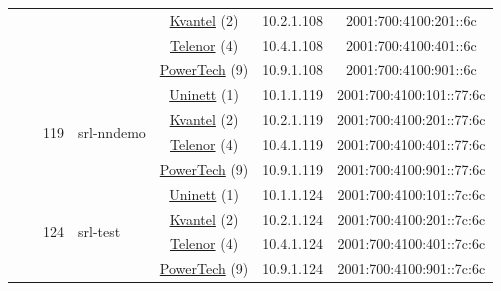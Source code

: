 \begin{small}
\begin{center}
\begin{longtable}{|c|c|c|c|c|c|c|c|}
  &  & \multicolumn{2}{|c|}{} & \multicolumn{2}{|c|}{\tiny{\href{http://kvantel.no}{Kvantel} (2)}} & \tiny{10.2.1.108} & \tiny{2001:700:4100:201::6c} \\* \cline{5-5}\cline{6-6}\cline{7-7}\cline{8-8}
  &  & \multicolumn{2}{|c|}{} & \multicolumn{2}{|c|}{\tiny{\href{https://www.telenor.no}{Telenor} (4)}} & \tiny{10.4.1.108} & \tiny{2001:700:4100:401::6c} \\* \cline{5-5}\cline{6-6}\cline{7-7}\cline{8-8}
  &  & \multicolumn{2}{|c|}{} & \multicolumn{2}{|c|}{\tiny{\href{http://www.powertech.no}{PowerTech} (9)}} & \tiny{10.9.1.108} & \tiny{2001:700:4100:901::6c} \\* \cline{3-3}\cline{4-4}\cline{5-5}\cline{6-6}\cline{7-7}\cline{8-8}
  &  & \multirow{4}{*}{\tiny{119}} & \multicolumn{1}{|l|}{\multirow{4}{*}{\tiny{srl-nndemo}}} & \multicolumn{2}{|c|}{\tiny{\href{https://www.uninett.no}{Uninett} (1)}} & \tiny{10.1.1.119} & \tiny{2001:700:4100:101::77:6c} \\* \cline{5-5}\cline{6-6}\cline{7-7}\cline{8-8}
  &  &  &  & \multicolumn{2}{|c|}{\tiny{\href{http://kvantel.no}{Kvantel} (2)}} & \tiny{10.2.1.119} & \tiny{2001:700:4100:201::77:6c} \\* \cline{5-5}\cline{6-6}\cline{7-7}\cline{8-8}
  &  &  &  & \multicolumn{2}{|c|}{\tiny{\href{https://www.telenor.no}{Telenor} (4)}} & \tiny{10.4.1.119} & \tiny{2001:700:4100:401::77:6c} \\* \cline{5-5}\cline{6-6}\cline{7-7}\cline{8-8}
  &  &  &  & \multicolumn{2}{|c|}{\tiny{\href{http://www.powertech.no}{PowerTech} (9)}} & \tiny{10.9.1.119} & \tiny{2001:700:4100:901::77:6c} \\* \cline{3-3}\cline{4-4}\cline{5-5}\cline{6-6}\cline{7-7}\cline{8-8}
  &  & \multirow{4}{*}{\tiny{124}} & \multicolumn{1}{|l|}{\multirow{4}{*}{\tiny{srl-test}}} & \multicolumn{2}{|c|}{\tiny{\href{https://www.uninett.no}{Uninett} (1)}} & \tiny{10.1.1.124} & \tiny{2001:700:4100:101::7c:6c} \\* \cline{5-5}\cline{6-6}\cline{7-7}\cline{8-8}
  &  &  &  & \multicolumn{2}{|c|}{\tiny{\href{http://kvantel.no}{Kvantel} (2)}} & \tiny{10.2.1.124} & \tiny{2001:700:4100:201::7c:6c} \\* \cline{5-5}\cline{6-6}\cline{7-7}\cline{8-8}
  &  &  &  & \multicolumn{2}{|c|}{\tiny{\href{https://www.telenor.no}{Telenor} (4)}} & \tiny{10.4.1.124} & \tiny{2001:700:4100:401::7c:6c} \\* \cline{5-5}\cline{6-6}\cline{7-7}\cline{8-8}
  &  &  &  & \multicolumn{2}{|c|}{\tiny{\href{http://www.powertech.no}{PowerTech} (9)}} & \tiny{10.9.1.124} & \tiny{2001:700:4100:901::7c:6c} \\* \cline{3-3}\cline{4-4}\cline{5-5}\cline{6-6}\cline{7-7}\cline{8-8}

\end{longtable}
\end{center}
\end{small}
